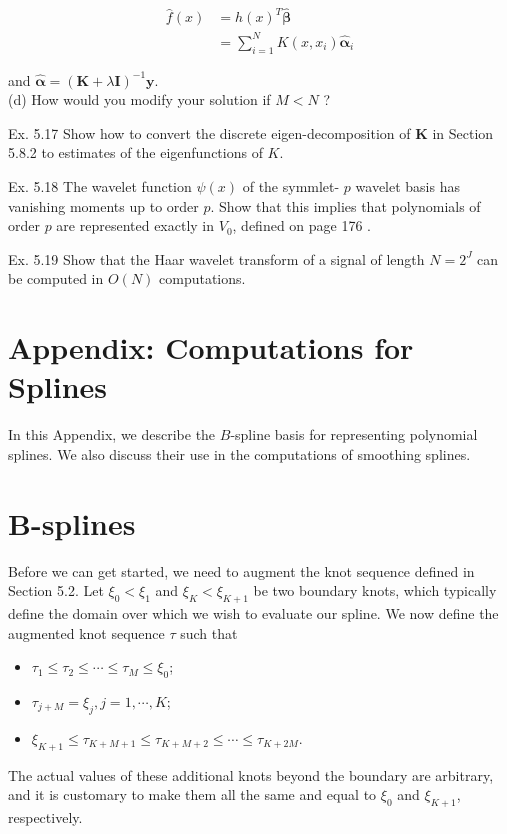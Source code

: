 \documentclass[10pt]{article}
\begin{document}
\begin{align*}
\hat{f}(x) & =h(x)^{T} \hat{\boldsymbol{\beta}} \\
& =\sum_{i=1}^{N} K\left(x, x_{i}\right) \hat{\boldsymbol{\alpha}}_{i} \tag{5.76}
\end{align*}


and $\hat{\boldsymbol{\alpha}}=(\mathbf{K}+\lambda \mathbf{I})^{-1} \mathbf{y}$.\\
(d) How would you modify your solution if $M<N$ ?

Ex. 5.17 Show how to convert the discrete eigen-decomposition of $\mathbf{K}$ in Section 5.8.2 to estimates of the eigenfunctions of $K$.

Ex. 5.18 The wavelet function $\psi(x)$ of the symmlet- $p$ wavelet basis has vanishing moments up to order $p$. Show that this implies that polynomials of order $p$ are represented exactly in $V_{0}$, defined on page 176 .

Ex. 5.19 Show that the Haar wavelet transform of a signal of length $N=2^{J}$ can be computed in $O(N)$ computations.

\section*{Appendix: Computations for Splines}
In this Appendix, we describe the $B$-spline basis for representing polynomial splines. We also discuss their use in the computations of smoothing splines.

\section*{B-splines}
Before we can get started, we need to augment the knot sequence defined in Section 5.2. Let $\xi_{0}<\xi_{1}$ and $\xi_{K}<\xi_{K+1}$ be two boundary knots, which typically define the domain over which we wish to evaluate our spline. We now define the augmented knot sequence $\tau$ such that

\begin{itemize}
  \item $\tau_{1} \leq \tau_{2} \leq \cdots \leq \tau_{M} \leq \xi_{0}$;
  \item $\tau_{j+M}=\xi_{j}, j=1, \cdots, K$;
  \item $\xi_{K+1} \leq \tau_{K+M+1} \leq \tau_{K+M+2} \leq \cdots \leq \tau_{K+2 M}$.
\end{itemize}

The actual values of these additional knots beyond the boundary are arbitrary, and it is customary to make them all the same and equal to $\xi_{0}$ and $\xi_{K+1}$, respectively.
\end{document}
